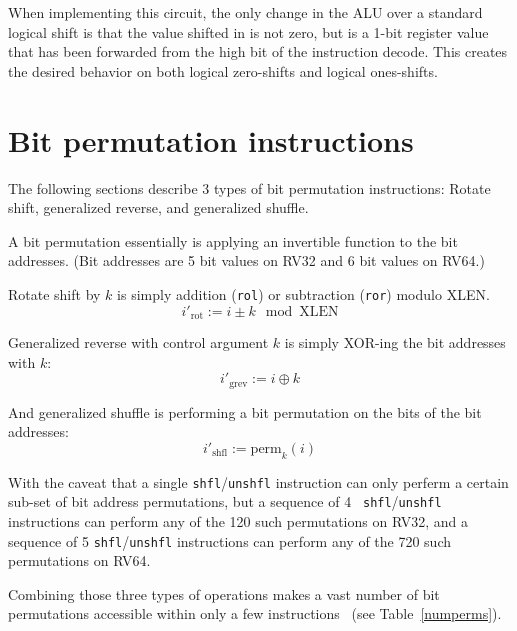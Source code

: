 When implementing this circuit, the only change in the ALU over a
standard logical shift is that the value shifted in is not zero, but is
a 1-bit register value that has been forwarded from the high bit of the
instruction decode. This creates the desired behavior on both logical
zero-shifts and logical ones-shifts.


\section{Bit permutation instructions}

The following sections describe 3 types of bit permutation instructions: Rotate
shift, generalized reverse, and generalized shuffle.

A bit permutation essentially is applying an invertible function to the bit addresses. (Bit
addresses are 5 bit values on RV32 and 6 bit values on RV64.)

Rotate shift by $k$ is simply addition ({\tt rol}) or subtraction ({\tt ror}) modulo XLEN.
$$ i'_\mathrm{rot} := i \pm k \mod \mathrm{XLEN} $$

Generalized reverse with control argument $k$ is simply XOR-ing the bit addresses with $k$:
$$ i'_\mathrm{grev} := i \oplus k $$

And generalized shuffle is performing a bit permutation on the bits of the bit addresses:
$$ i'_\mathrm{shfl} := \mathrm{perm}_k(i) $$

With the caveat that a single {\tt shfl}/{\tt unshfl} instruction can only
perferm a certain sub-set of bit address permutations, but a sequence of 4 {\tt
shfl}/{\tt unshfl} instructions can perform any of the 120 such permutations on
RV32, and a sequence of 5 {\tt shfl}/{\tt unshfl} instructions can perform any
of the 720 such permutations on RV64.

Combining those three types of operations makes a vast number of bit
permutations accessible within only a few instructions~\cite{Wolf19A} (see
Table~\ref{numperms}).

